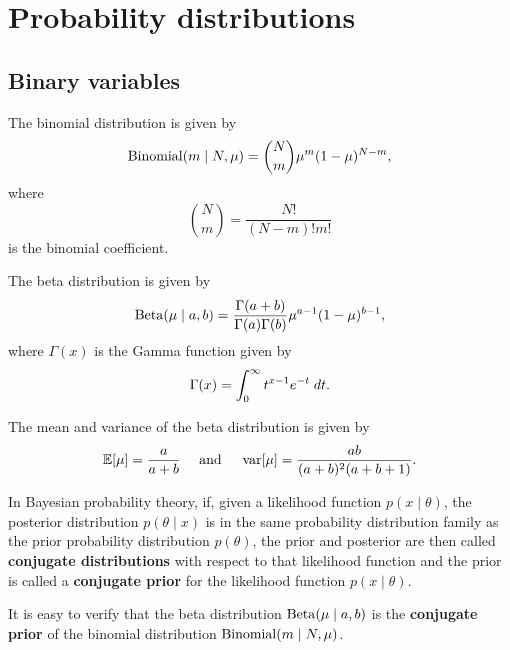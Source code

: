 \documentclass[a4paper]{article}
\begin{document}
\maketitle

\tableofcontents

\section{Probability distributions}

\subsection{Binary variables}

\begin{defi}
The binomial distribution is given by 
\[
\operatorname{Binomial}(m \mid N, \mu) 
= \binom{N}{m} \mu^{m} (1 - \mu)^{N - m},
\]
where 
\[
\binom{N}{m} = \frac{N!}{(N - m)! m!} 
\]
is the binomial coefficient.
\end{defi}

\begin{defi}
The beta distribution is given by 
\[
\operatorname{Beta}(\mu \mid a, b) 
= \frac{\Gamma(a + b)}{\Gamma(a) \Gamma(b)}
\mu^{a - 1} (1 - \mu)^{b - 1},
\]
where $\Gamma(x)$ is the Gamma function given by 
\[
\Gamma(x) = \int_0^\infty t^{x - 1} e^{-t} \; d t.
\]
\end{defi}
The mean and variance of the beta distribution is given 
by 
\[
\begin{aligned}
\mathbb{E}[\mu] = \frac{a}{a + b}
\quad \text{ and } \quad
\operatorname{var}[\mu] = \frac{ab}{(a + b)^2 (a + b + 1)}.
\end{aligned}
\]

\begin{defi}
In Bayesian probability theory, if, given a likelihood 
function $p(x \mid \theta)$, the posterior distribution 
$p(\theta \mid x)$ is in the same probability distribution 
family as the prior probability distribution 
$p(\theta)$, the prior and posterior are then called 
\textbf{conjugate distributions} with respect to that 
likelihood function and the prior is called a \textbf{conjugate 
prior} for the likelihood function $p(x \mid \theta)$. 
\end{defi}

It is easy to verify that the beta distribution $\operatorname{Beta}
(\mu \mid a, b)$ is  
the \textbf{conjugate prior} of the binomial distribution
$\operatorname{Binomial}(m \mid N, \mu)$.
\end{document}
